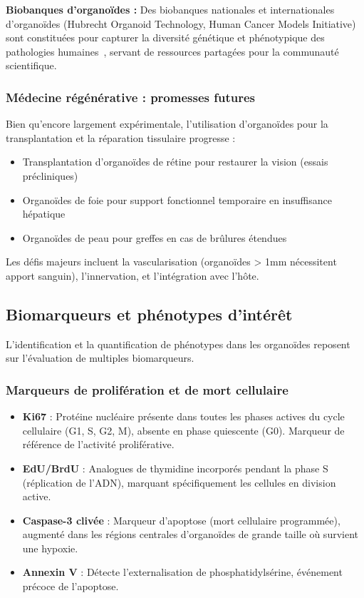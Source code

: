 \textbf{Biobanques d'organoïdes :}
Des biobanques nationales et internationales d'organoïdes (Hubrecht Organoid Technology, Human Cancer Models Initiative) sont constituées pour capturer la diversité génétique et phénotypique des pathologies humaines~\cite{Drost2019}, servant de ressources partagées pour la communauté scientifique.

\subsubsection{Médecine régénérative : promesses futures}

Bien qu'encore largement expérimentale, l'utilisation d'organoïdes pour la transplantation et la réparation tissulaire progresse :
\begin{itemize}
    \item Transplantation d'organoïdes de rétine pour restaurer la vision (essais précliniques)
    \item Organoïdes de foie pour support fonctionnel temporaire en insuffisance hépatique
    \item Organoïdes de peau pour greffes en cas de brûlures étendues
\end{itemize}

Les défis majeurs incluent la vascularisation (organoïdes > 1mm nécessitent apport sanguin), l'innervation, et l'intégration avec l'hôte.

\subsection{Biomarqueurs et phénotypes d'intérêt}

L'identification et la quantification de phénotypes dans les organoïdes reposent sur l'évaluation de multiples biomarqueurs.

\subsubsection{Marqueurs de prolifération et de mort cellulaire}

\begin{itemize}
    \item \textbf{Ki67} : Protéine nucléaire présente dans toutes les phases actives du cycle cellulaire (G1, S, G2, M), absente en phase quiescente (G0). Marqueur de référence de l'activité proliférative.
    \item \textbf{EdU/BrdU} : Analogues de thymidine incorporés pendant la phase S (réplication de l'ADN), marquant spécifiquement les cellules en division active.
    \item \textbf{Caspase-3 clivée} : Marqueur d'apoptose (mort cellulaire programmée), augmenté dans les régions centrales d'organoïdes de grande taille où survient une hypoxie.
    \item \textbf{Annexin V} : Détecte l'externalisation de phosphatidylsérine, événement précoce de l'apoptose.
\end{itemize}

